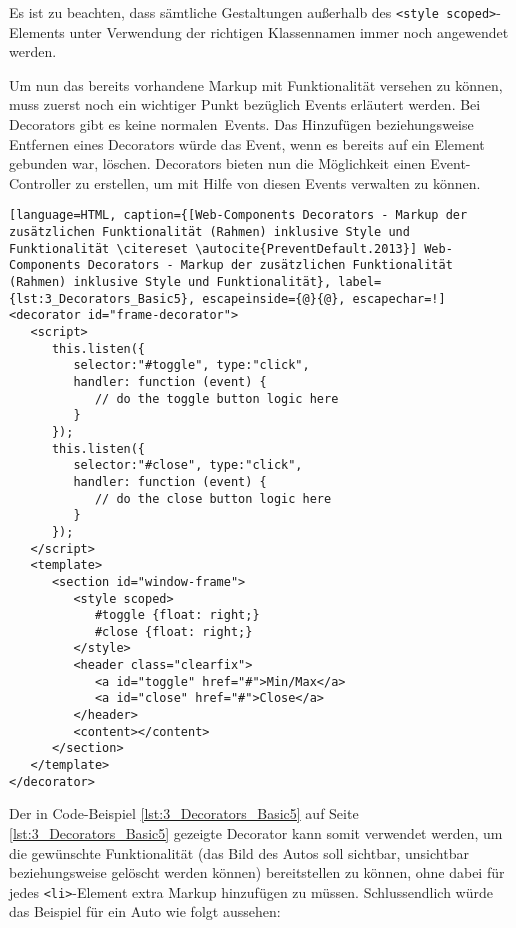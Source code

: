 {Es ist zu beachten, dass sämtliche Gestaltungen außerhalb des \lstinline|<style scoped>|-Elements unter Verwendung der richtigen Klassennamen immer noch angewendet werden.

Um nun das bereits vorhandene Markup mit Funktionalität versehen zu können, muss zuerst noch ein wichtiger Punkt bezüglich Events erläutert werden. Bei Decorators gibt es keine \glqq normalen\grqq\ Events. Das Hinzufügen beziehungsweise Entfernen eines Decorators würde das Event, wenn es bereits auf ein Element gebunden war, löschen. Decorators bieten nun die Möglichkeit einen Event-Controller zu erstellen, um mit Hilfe von diesen Events verwalten zu können.

\begin{lstlisting}[language=HTML, caption={[Web-Components Decorators - Markup der zusätzlichen Funktionalität (Rahmen) inklusive Style und Funktionalität \citereset \autocite{PreventDefault.2013}] Web-Components Decorators - Markup der zusätzlichen Funktionalität (Rahmen) inklusive Style und Funktionalität}, label={lst:3_Decorators_Basic5}, escapeinside={@}{@}, escapechar=!]
<decorator id="frame-decorator">
   <script>
      this.listen({
         selector:"#toggle", type:"click",
         handler: function (event) {
            // do the toggle button logic here
         }
      });
      this.listen({
         selector:"#close", type:"click",
         handler: function (event) {
            // do the close button logic here
         }
      });
   </script>
   <template>
      <section id="window-frame">
         <style scoped>
            #toggle {float: right;}
            #close {float: right;}
         </style>
         <header class="clearfix">
            <a id="toggle" href="#">Min/Max</a>
            <a id="close" href="#">Close</a>
         </header>
         <content></content>
      </section>
   </template>
</decorator>
\end{lstlisting}


Der in Code-Beispiel \ref{lst:3_Decorators_Basic5} auf Seite \ref{lst:3_Decorators_Basic5} gezeigte Decorator kann somit verwendet werden, um die gewünschte Funktionalität (das Bild des Autos soll sichtbar, unsichtbar beziehungsweise gelöscht werden können) bereitstellen zu können, ohne dabei für jedes \lstinline|<li>|-Element extra Markup hinzufügen zu müssen. Schlussendlich würde das Beispiel für ein Auto wie folgt aussehen:

}
